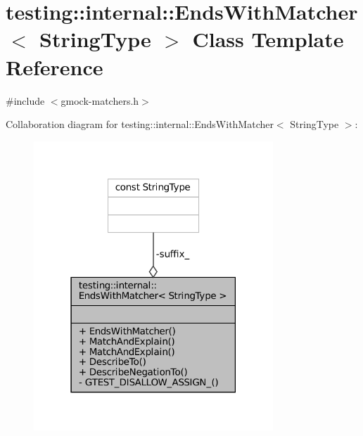 \hypertarget{classtesting_1_1internal_1_1EndsWithMatcher}{}\section{testing\+:\+:internal\+:\+:Ends\+With\+Matcher$<$ String\+Type $>$ Class Template Reference}
\label{classtesting_1_1internal_1_1EndsWithMatcher}


{\ttfamily \#include $<$gmock-\/matchers.\+h$>$}



Collaboration diagram for testing\+:\+:internal\+:\+:Ends\+With\+Matcher$<$ String\+Type $>$\+:
\nopagebreak
\begin{figure}[H]
\begin{center}
\leavevmode
\includegraphics[width=255pt]{classtesting_1_1internal_1_1EndsWithMatcher__coll__graph}
\end{center}
\end{figure}
